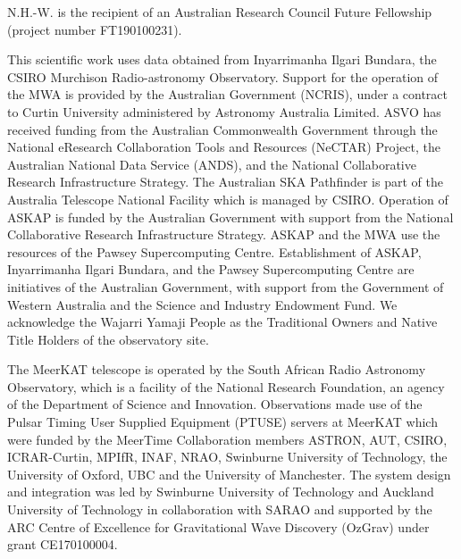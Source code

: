 \documentclass[preprint2,linenumbers]{aastex631}
\begin{document}
\begin{acknowledgments}
 N.H.-W. is the recipient of an Australian Research Council Future Fellowship (project number FT190100231).
 
 This scientific work uses data obtained from Inyarrimanha Ilgari Bundara, the CSIRO Murchison Radio-astronomy Observatory. Support for the operation of the MWA is provided by the Australian Government (NCRIS), under a contract to Curtin University administered by Astronomy Australia Limited. ASVO has received funding from the Australian Commonwealth Government through the National eResearch Collaboration Tools and Resources (NeCTAR) Project, the Australian National Data Service (ANDS), and the National Collaborative Research Infrastructure Strategy.
The Australian SKA Pathfinder is part of the Australia Telescope National Facility which is managed by CSIRO. Operation of ASKAP is funded by the Australian Government with support from the National Collaborative Research Infrastructure Strategy. ASKAP and the MWA use the resources of the Pawsey Supercomputing Centre. Establishment of ASKAP, Inyarrimanha Ilgari Bundara, and the Pawsey Supercomputing Centre are initiatives of the Australian Government, with support from the Government of Western Australia and the Science and Industry Endowment Fund. We acknowledge the Wajarri Yamaji People as the Traditional Owners and Native Title Holders of the observatory site.

The MeerKAT telescope is operated by the South African Radio Astronomy Observatory, which is a facility of the National Research Foundation, an agency of the Department of Science and Innovation.
  Observations made use of the Pulsar Timing User Supplied Equipment (PTUSE) servers at MeerKAT which were funded by the MeerTime Collaboration members ASTRON, AUT, CSIRO, ICRAR-Curtin, MPIfR, INAF, NRAO, Swinburne University of Technology, the University of Oxford, UBC and the University of Manchester.  The system design and integration was led by Swinburne University of Technology and Auckland University of Technology in collaboration with SARAO and supported by the ARC Centre of Excellence for Gravitational Wave Discovery (OzGrav) under grant CE170100004.


\end{acknowledgments}
\end{document}
